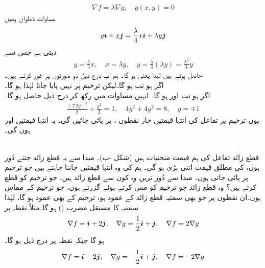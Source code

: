 \begin{align*}
\nabla f=\lambda \nabla g,\quad g(x,y)=0
\end{align*}
مساوات ڈھلوان ہمیں
\begin{align*}
y{\boldsymbol{i}}+x{\boldsymbol{j}}=\frac{\lambda}{4}x{\boldsymbol{i}}+\lambda y{\boldsymbol{j}}
\end{align*}
دیتی ہے جس سے
\begin{align*}
y=\frac{\lambda}{4}x,\quad x=\lambda y, \quad y=\frac{\lambda}{4}(\lambda y)=\frac{\lambda^2}{4}y
\end{align*}
حاصل ہوتے ہیں لہٰذا  یعنی  ہو گا۔ ہم اب درج ذیل دو صورتوں پر غور کرتے ہیں۔\\
  اگر  ہو تب  ہو گا۔لیکن  ترخیم پر نہیں پایا جاتا   لہٰذا  ہو گا۔\\
  اگر  ہو تب  اور  ہو گا۔ انہیں مساوات  میں رکھ کر  درج ذیل حاصل ہو گا۔
\begin{align*}
\frac{(\mp 2y)^2}{8}+\frac{y^2}{2}=1,\quad 4y^2+4y^2=8,\quad y=\mp 1
\end{align*}
یوں ترخیم پر تفاعل  کی انتہا قیمتیں چار نقطوں  ،  پر پائی جائیں گی۔ یہ انتہا قیمتیں  اور  ہوں گی۔ 


\\
 قطع زائد  تفاعل  کی ہم قیمت منحنیات  ہیں (شکل -ب)۔ مبدا سے یہ قطع زائد جتنے دُور ہوں،  کی مطلق قیمت اتنی بڑی ہو گی۔ ہم  کی وہ  انتہا قیمتیں جاننا چاہتے ہیں جو ترخیم  پر پائی جاتی ہوں۔ مبدا سے دُور ترین وہ کون سے  قطع زائد ہیں،   جو ترخیم کو قطع کرتے ہیں؟ وہ قطع زائد جو ترخیم کو مس کرتے ہوئے گزرتے ہوں، جو ترخیم کے مماس ہوں۔ان نقطوں پر جو بھی سمتیہ قطع زائد کے عمود ہو، ترخیم کے بھی عمود ہو گا، لہٰذا   سمتیہ  کا مستقل مضرب () ہو گا۔مثلاً  نقطہ  پر
\begin{align*}
\nabla f={\boldsymbol{i}}+2{\boldsymbol{j}},\quad \nabla g=\frac{1}{2}{\boldsymbol{i}}+{\boldsymbol{j}},\quad \nabla f=2\nabla g
\end{align*}
ہو گا  جبکہ  نقطہ  پر درج ذیل ہو گا۔
\begin{align*}
\nabla f={\boldsymbol{i}}-2{\boldsymbol{j}},\quad \nabla g=-\frac{1}{2}{\boldsymbol{i}}+{\boldsymbol{j}},\quad \nabla f= -2\nabla g
\end{align*}


